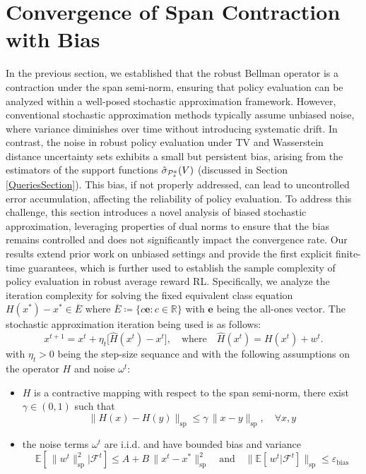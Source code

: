 \section{Convergence of Span Contraction with Bias} \label{spancontractionwithbias}
In the previous section, we established that the robust Bellman operator is a contraction under the span semi-norm, ensuring that policy evaluation can be analyzed within a well-posed stochastic approximation framework. However, conventional stochastic approximation methods typically assume unbiased noise, where variance diminishes over time without introducing systematic drift. In contrast, the noise in robust policy evaluation under TV and Wasserstein distance uncertainty sets exhibits a small but persistent bias, arising from the estimators of the support functions $\hat{\sigma}_{\mathcal{P}^a_s}(V)$ (discussed in Section \ref{QueriesSection}). This bias, if not properly addressed, can lead to uncontrolled error accumulation, affecting the reliability of policy evaluation. To address this challenge, this section introduces a novel analysis of biased stochastic approximation, leveraging properties of dual norms to ensure that the bias remains controlled and does not significantly impact the convergence rate. Our results extend prior work on unbiased settings and provide the first explicit finite-time guarantees, which is further used to establish the sample complexity of policy evaluation in robust average reward RL. Specifically, we analyze the iteration complexity for solving the fixed equivalent class equation $H(x^*) - x^* \in \overline{E}$ where $\overline{E}\coloneqq \{c \mathbf{e} : c \in \mathbb{R}\}$ with $\mathbf{e}$ being the all-ones vector. The stochastic approximation iteration being used is as follows:
\begin{equation}\label{eq:SA-update}
   x^{t+1}=x^t + \eta_t \bigl[\widehat{H}(x^t) - x^t\bigr],
   \quad
   \text{where}\quad
   \widehat{H}(x^t)=H(x^t) + w^t.
\end{equation}
with $\eta_t>0$ being the step-size sequance and with the following assumptions on the operator $H$ and noise $\omega^t$:
\begin{itemize}
\item $H$ is a contractive mapping with respect to the span semi-norm, there exist $\gamma \in (0,1)$ such that
\begin{equation} \label{eq:Hcontraction}
     \|H(x) - H(y)\|_{\mathrm{sp}}\leq \gamma\,\|x - y\|_{\mathrm{sp}}, \quad 
  \forall x, y
\end{equation}
\item the noise terms $\omega^t$ are i.i.d. and have bounded bias and variance
\begin{equation} \label{eq:omegabounded}
    \mathbb{E}[\,\|w^t\|_{\mathrm{sp}}^2 | \mathcal{F}^t] \le A + B\,\|x^t - x^*\|_{\mathrm{sp}}^2  \quad  \text{and}\quad \bigl\|\mathbb{E}[\,w^t | \mathcal{F}^t]\bigr\|_{\mathrm{sp}} \le \varepsilon_{\mathrm{bias}}
\end{equation}
\end{itemize}

